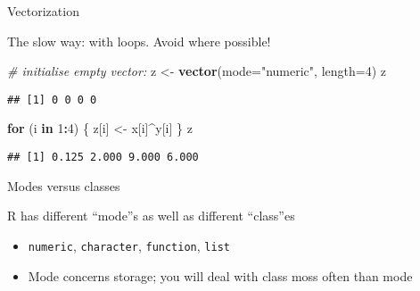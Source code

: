 \documentclass[ignorenonframetext,]{beamer}
\newenvironment{Shaded}{\begin{snugshade}}{\end{snugshade}}
\newcommand{\CommentTok}[1]{\textcolor[rgb]{0.56,0.35,0.01}{\textit{#1}}}
\newcommand{\ControlFlowTok}[1]{\textcolor[rgb]{0.13,0.29,0.53}{\textbf{#1}}}
\newcommand{\DataTypeTok}[1]{\textcolor[rgb]{0.13,0.29,0.53}{#1}}
\newcommand{\DecValTok}[1]{\textcolor[rgb]{0.00,0.00,0.81}{#1}}
\newcommand{\KeywordTok}[1]{\textcolor[rgb]{0.13,0.29,0.53}{\textbf{#1}}}
\newcommand{\NormalTok}[1]{#1}
\newcommand{\OperatorTok}[1]{\textcolor[rgb]{0.81,0.36,0.00}{\textbf{#1}}}
\newcommand{\StringTok}[1]{\textcolor[rgb]{0.31,0.60,0.02}{#1}}
\providecommand{\tightlist}{%
  \setlength{\itemsep}{0pt}\setlength{\parskip}{0pt}}
\begin{document}
\begin{frame}[fragile]{Vectorization}
\protect\hypertarget{vectorization-1}{}

The slow way: with loops. Avoid where possible!

\begin{Shaded}
\begin{Highlighting}[]
\CommentTok{# initialise empty vector:}
\NormalTok{z <-}\StringTok{ }\KeywordTok{vector}\NormalTok{(}\DataTypeTok{mode=}\StringTok{"numeric"}\NormalTok{, }\DataTypeTok{length=}\DecValTok{4}\NormalTok{)}
\NormalTok{z}
\end{Highlighting}
\end{Shaded}

\begin{verbatim}
## [1] 0 0 0 0
\end{verbatim}

\begin{Shaded}
\begin{Highlighting}[]
\ControlFlowTok{for}\NormalTok{ (i }\ControlFlowTok{in} \DecValTok{1}\OperatorTok{:}\DecValTok{4}\NormalTok{) \{}
\NormalTok{  z[i] <-}\StringTok{ }\NormalTok{x[i]}\OperatorTok{^}\NormalTok{y[i]}
\NormalTok{\}}
\NormalTok{z}
\end{Highlighting}
\end{Shaded}

\begin{verbatim}
## [1] 0.125 2.000 9.000 6.000
\end{verbatim}

\end{frame}

\begin{frame}[fragile]{Modes versus classes}
\protect\hypertarget{modes-versus-classes}{}

R has different ``mode''s as well as different ``class''es

\begin{itemize}
\tightlist
\item
  \texttt{numeric}, \texttt{character}, \texttt{function}, \texttt{list}
\item
  Mode concerns storage; you will deal with class moss often than mode
\end{itemize}

\end{frame}
\end{document}

